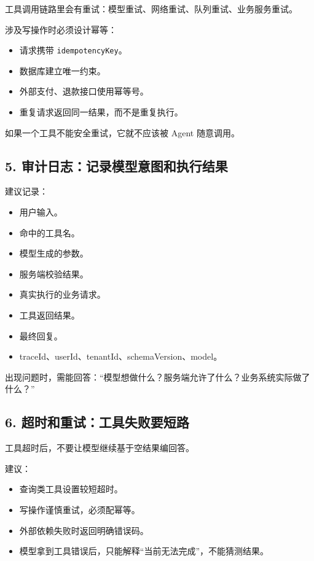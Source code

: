 \documentclass[9pt,a4paper,twocolumn]{ctexart}
\begin{document}
工具调用链路里会有重试：模型重试、网络重试、队列重试、业务服务重试。



涉及写操作时必须设计幂等：


\begin{itemize}[itemsep=1pt, topsep=2pt]
  \item 请求携带 \texttt{idempotencyKey}。
  \item 数据库建立唯一约束。
  \item 外部支付、退款接口使用幂等号。
  \item 重复请求返回同一结果，而不是重复执行。
\end{itemize}


如果一个工具不能安全重试，它就不应该被 Agent 随意调用。



\subsection*{5. 审计日志：记录模型意图和执行结果}


建议记录：


\begin{itemize}[itemsep=1pt, topsep=2pt]
  \item 用户输入。
  \item 命中的工具名。
  \item 模型生成的参数。
  \item 服务端校验结果。
  \item 真实执行的业务请求。
  \item 工具返回结果。
  \item 最终回复。
  \item traceId、userId、tenantId、schemaVersion、model。
\end{itemize}


出现问题时，需能回答：“模型想做什么？服务端允许了什么？业务系统实际做了什么？”



\subsection*{6. 超时和重试：工具失败要短路}


工具超时后，不要让模型继续基于空结果编回答。



建议：


\begin{itemize}[itemsep=1pt, topsep=2pt]
  \item 查询类工具设置较短超时。
  \item 写操作谨慎重试，必须配幂等。
  \item 外部依赖失败时返回明确错误码。
  \item 模型拿到工具错误后，只能解释“当前无法完成”，不能猜测结果。
\end{itemize}
\end{document}
